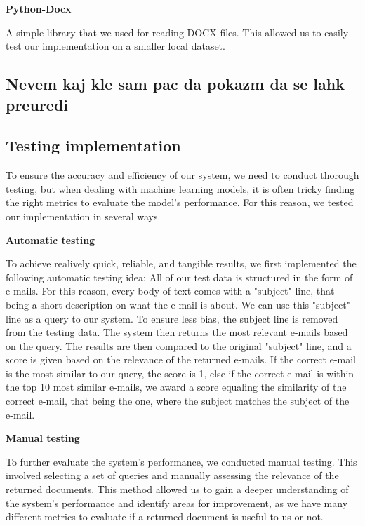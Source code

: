 \documentclass[12pt,a4paper]{article}
\begin{document}
        \bigskip
        \noindent
        \textbf{Python-Docx}

        \noindent
        A simple library that we used for reading DOCX files. This allowed us to easily test our implementation on a smaller local dataset.
    
    \subsection{Nevem kaj kle sam pac da pokazm da se lahk preuredi}

    \newpage
    \subsection{Testing implementation}
    To ensure the accuracy and efficiency of our system, we need to conduct thorough testing, but when dealing with machine learning models, it is often tricky finding the right metrics to evaluate the model's performance. For this reason, we tested our implementation in several ways.

        \bigskip
        \noindent
        \textbf{Automatic testing}
        
        \noindent
        To achieve realively quick, reliable, and tangible results, we first implemented the following automatic testing idea:
        All of our test data is structured in the form of e-mails. For this reason, every body of text comes with a "subject" line, that being a short description on what the e-mail is about. We can use this "subject" line as a query to our system. To ensure less bias, the subject line is removed from the testing data. The system then returns the most relevant e-mails based on the query. The results are then compared to the original "subject" line, and a score is given based on the relevance of the returned e-mails. If the correct e-mail is the most similar to our query, the score is 1, else if the correct e-mail is within the top 10 most similar e-mails, we award a score equaling the similarity of the correct e-mail, that being the one, where the subject matches the subject of the e-mail.

        \bigskip
        \noindent
        \textbf{Manual testing}

        \noindent
        To further evaluate the system's performance, we conducted manual testing. This involved selecting a set of queries and manually assessing the relevance of the returned documents. This method allowed us to gain a deeper understanding of the system's performance and identify areas for improvement, as we have many different metrics to evaluate if a returned document is useful to us or not.
\end{document}
